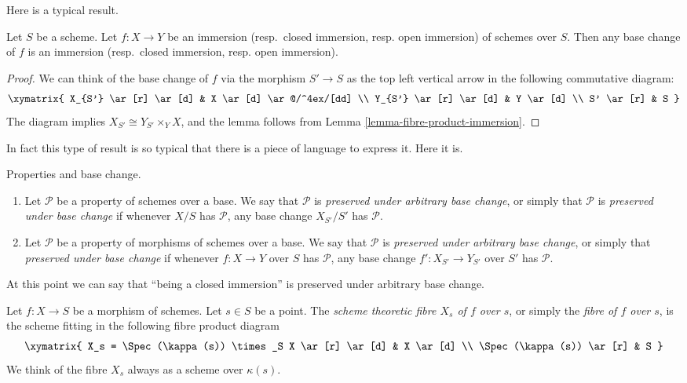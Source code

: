 \noindent
Here is a typical result.

\begin{lemma}
\label{lemma-base-change-immersion}
Let $S$ be a scheme. Let $f : X \to Y$ be an
immersion (resp.\ closed immersion, resp. open immersion)
of schemes over $S$. Then any base change of $f$ is an
immersion (resp.\ closed immersion, resp. open immersion).
\end{lemma}

\begin{proof}
We can think of the base change of $f$ via the morphism
$S' \to S$ as the top left vertical arrow in the following
commutative diagram:
$$
\xymatrix{
X_{S'} \ar[r] \ar[d] & X \ar[d] \ar@/^4ex/[dd] \\
Y_{S'} \ar[r] \ar[d] & Y \ar[d] \\
S' \ar[r] & S
}
$$
The diagram implies $X_{S'} \cong Y_{S'} \times_Y X$,
and the lemma follows from Lemma \ref{lemma-fibre-product-immersion}.
\end{proof}

\noindent
In fact this type of result is so typical that there is a
piece of language to express it. Here it is.

\begin{definition}
\label{definition-preserved-by-base-change}
Properties and base change.
\begin{enumerate}
\item Let $\mathcal{P}$ be a property of schemes over a base.
We say that $\mathcal{P}$ is {\it preserved under arbitrary base change},
or simply that $\mathcal{P}$ is {\it preserved under base change}
if whenever $X/S$
has $\mathcal{P}$, any base change $X_{S'}/S'$ has $\mathcal{P}$.
\item Let $\mathcal{P}$ be a property of morphisms of schemes over a base.
We say that $\mathcal{P}$ is {\it preserved under arbitrary base change},
or simply that {\it preserved under base change} if whenever
$f : X \to Y$ over $S$ has $\mathcal{P}$, any base change
$f' : X_{S'} \to Y_{S'}$ over $S'$ has $\mathcal{P}$.
\end{enumerate}
\end{definition}

\noindent
At this point we can say that ``being a closed immersion'' is
preserved under arbitrary base change.

\begin{definition}
\label{definition-fibre}
Let $f : X \to S$ be a morphism of schemes.
Let $s \in S$ be a point.
The {\it scheme theoretic fibre $X_s$ of $f$ over $s$},
or simply the {\it fibre of $f$ over $s$},
is the scheme fitting in the following fibre product diagram
$$
\xymatrix{
X_s = \Spec(\kappa(s)) \times_S X \ar[r] \ar[d] &
X \ar[d] \\
\Spec(\kappa(s)) \ar[r] &
S
}
$$
We think of the fibre $X_s$ always as a scheme over $\kappa(s)$.
\end{definition}

